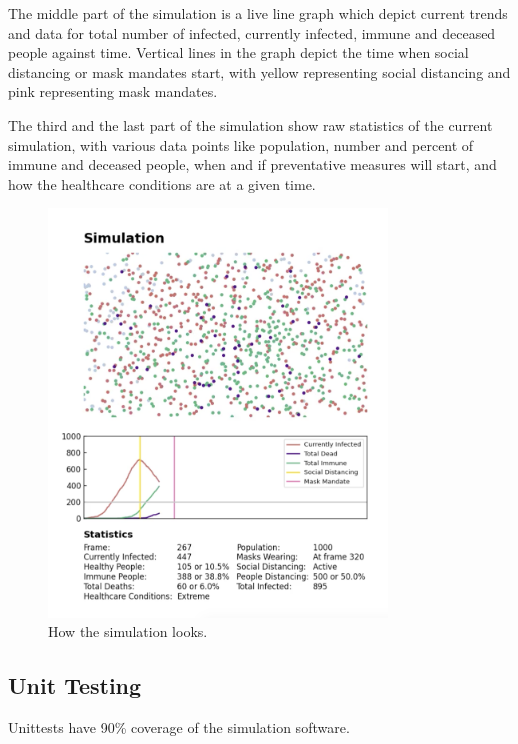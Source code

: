 \documentclass[11pt]{article}
\begin{document}
The middle part of the simulation is a live line graph which depict current trends and data for total number of infected, currently infected, immune and deceased people against time. Vertical lines in the graph depict the time when social distancing or mask mandates start, with yellow representing social distancing and pink representing mask mandates. 

The third and the last part of the simulation show raw statistics of the current simulation, with various data points like population, number and percent of immune and deceased people, when and if preventative measures will start, and how the healthcare conditions are at a given time.

\begin{figure}[H]
    \centering
    \includegraphics[width=9cm]{figures/simu.png}
    \caption{How the simulation looks.}
    \label{fig:my_label}
\end{figure}
\subsection{Unit Testing}
Unittests have 90\% coverage of the simulation software.
\end{document}
